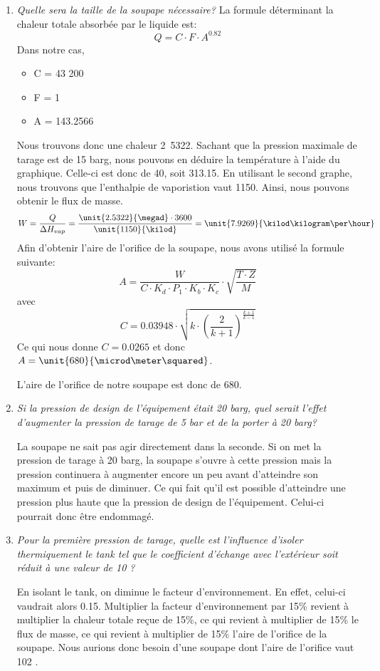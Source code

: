 \documentclass{report}
\begin{document}
\begin{enumerate}
\item\textit{Quelle sera la taille de la soupape nécessaire?}
La formule déterminant la chaleur totale absorbée par le liquide est: $$ Q = C \cdot F \cdot A^{0.82} $$
Dans notre cas,
\begin{itemize}
\item C = 43 200
\item F = 1
\item A = 143.2566 \meter\squared
\end{itemize}
Nous trouvons donc une chaleur \unit{2.5322}{\megad\watt}.
Sachant que la pression maximale de tarage est de 15 barg, nous pouvons en déduire la température à l'aide du graphique. Celle-ci est donc de 40\celsius, soit 313.15\kelvin. En utilisant le second graphe, nous trouvons que l'enthalpie de vaporistion vaut \unit{1150}{\kilo\joule\per\kilogram}. Ainsi, nous pouvons obtenir le flux de masse. $$ W = \frac{Q}{\Delta H_{vap}} = \frac{\unit{2.5322}{\megad} \cdot 3600}{\unit{1150}{\kilod}} = \unit{7.9269}{\kilod\kilogram\per\hour} $$
Afin d'obtenir l'aire de l'orifice de la soupape, nous avons utilisé la formule suivante:
$$ A = \frac{W}{C \cdot K_d \cdot P_1 \cdot K_b \cdot K_c}\cdot\sqrt{\frac{T \cdot Z}{M}} $$ avec $$ C = 0.03948\cdot\sqrt{k\cdot\left(\frac{2}{k+1}\right)^\frac{k+1}{k-1}} $$
Ce qui nous donne $ C = 0.0265$ et donc $A = \unit{680}{\microd\meter\squared}$.

L'aire de l'orifice de notre soupape est donc de \unit{680}{\microd\meter\squared}.

\item\textit{Si la pression de design de l'équipement était 20 barg, quel serait l'effet d'augmenter la pression de tarage de 5 bar et de la porter à 20 barg?}

La soupape ne sait pas agir directement dans la seconde. Si on met la pression de tarage à 20 barg, la soupape s'ouvre à cette pression mais la pression continuera à augmenter encore un peu avant d'atteindre son maximum et puis de diminuer. Ce qui fait qu'il est possible d'atteindre une pression plus haute que la pression de design de l'équipement. Celui-ci pourrait donc être endommagé.

\item\textit{Pour la première pression de tarage, quelle est l'influence d'isoler thermiquement le tank tel que le coefficient d'échange avec l'extérieur soit réduit à une valeur de 10 \watt\per\meter\squared\kelvin ?}

En isolant le tank, on diminue le facteur d'environnement. En effet, celui-ci vaudrait alors 0.15. Multiplier la facteur d'environnement par 15\% revient à multiplier la chaleur totale reçue de 15\%, ce qui revient à multiplier de 15\% le flux de masse, ce qui revient à multiplier de 15\% l'aire de l'orifice de la soupape. Nous aurions donc besoin d'une soupape dont l'aire de l'orifice vaut 102 \microd\meter\squared.
\end{enumerate}
\end{document}
